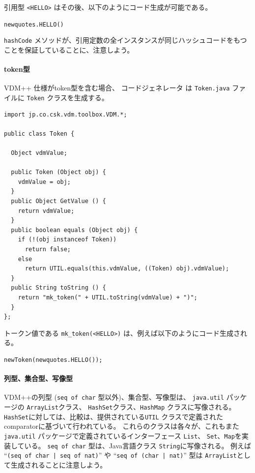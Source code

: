 \documentclass[\pformat,11pt]{jarticle}
\newcommand{\Tcg}{コードジェネレータ}
\begin{document}
引用型 \verb+<HELLO>+ はその後、以下のようにコード生成が可能である。
\begin{screen}
\begin{alltt}
new quotes.HELLO()
\end{alltt}
\end{screen}
 \texttt{hashCode} メソッドが、引用定数の全インスタンスが同じハッシュコードをもつことを保証していることに、注意しよう。

\paragraph{token型}

VDM++ 仕様がtoken型を含む場合、 \Tcg{} は  \verb+Token.java+ ファイルに \verb+Token+ クラスを生成する。

\begin{screen}
\begin{small}  
\begin{verbatim}
import jp.co.csk.vdm.toolbox.VDM.*;

public class Token {

  Object vdmValue;

  public Token (Object obj) {
    vdmValue = obj;
  }
  public Object GetValue () {
    return vdmValue;
  }
  public boolean equals (Object obj) {
    if (!(obj instanceof Token)) 
      return false;
    else 
      return UTIL.equals(this.vdmValue, ((Token) obj).vdmValue);
  }
  public String toString () {
    return "mk_token(" + UTIL.toString(vdmValue) + ")";
  }
};
\end{verbatim}  
\end{small}  
\end{screen}

トークン値である \verb+mk_token(<HELLO>)+ は、例えば以下のようにコード生成される。

\begin{screen}
\begin{alltt}
new Token(new quotes.HELLO());
\end{alltt}
\end{screen}

\paragraph{列型、集合型、写像型}

VDM++の列型 ({\tt seq of char} 型以外)、集合型、写像型は、 \texttt{java.util} パッケージの \texttt{ArrayList}クラス、 \texttt{HashSet}クラス、\texttt{HashMap} クラスに写像される。
\texttt{HashSet}に対しては、比較は、提供されている\texttt{UTIL} クラスで定義されたcomparatorに基づいて行われている。
これらのクラスは各々が、これもまた \texttt{java.util} パッケージで定義されているインターフェース \texttt{List}、 \texttt{Set}、\texttt{Map}を実装している。
 {\tt seq of char} 型は、Java言語クラス {\tt String}に写像される。
例えば ``{\tt (seq of char | seq of nat)}'' や ``{\tt seq of (char | nat)}'' 型は {\tt ArrayList}として生成されることに注意しよう。
\end{document}
